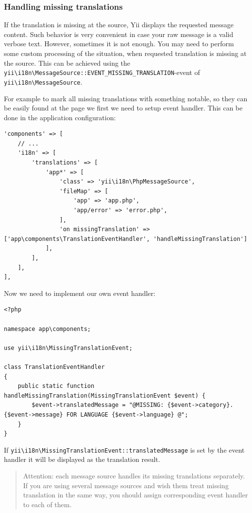 \subsubsection{Handling missing translations}
If the translation is missing at the source, Yii displays the requested message content. Such behavior is very convenient
in case your raw message is a valid verbose text. However, sometimes it is not enough.
You may need to perform some custom processing of the situation, when requested translation is missing at the source.
This can be achieved using the \texttt{yii{\allowbreak{}\textbackslash}i18n{\allowbreak{}\textbackslash}MessageSource\allowbreak{}::\allowbreak{}EVENT\_MISSING\_TRANSLATION}-event of \texttt{yii{\allowbreak{}\textbackslash}i18n{\allowbreak{}\textbackslash}MessageSource}.

For example to mark all missing translations with something notable, so they can be easily found at the page we
first we need to setup event handler. This can be done in the application configuration:

\lstset{language=php}\begin{lstlisting}
'components' => [
    // ...
    'i18n' => [
        'translations' => [
            'app*' => [
                'class' => 'yii\i18n\PhpMessageSource',
                'fileMap' => [
                    'app' => 'app.php',
                    'app/error' => 'error.php',
                ],
                'on missingTranslation' => ['app\components\TranslationEventHandler', 'handleMissingTranslation']
            ],
        ],
    ],
],
\end{lstlisting}
Now we need to implement our own event handler:

\lstset{language=php}\begin{lstlisting}
<?php

namespace app\components;

use yii\i18n\MissingTranslationEvent;

class TranslationEventHandler
{
    public static function handleMissingTranslation(MissingTranslationEvent $event) {
        $event->translatedMessage = "@MISSING: {$event->category}.{$event->message} FOR LANGUAGE {$event->language} @";
    }
}
\end{lstlisting}
If \texttt{yii{\allowbreak{}\textbackslash}i18n{\allowbreak{}\textbackslash}MissingTranslationEvent\allowbreak{}::\allowbreak{}translatedMessage} is set by the event handler it will be displayed as the translation result.

\begin{quote}Attention: each message source handles its missing translations separately. If you are using several message sources
and wish them treat missing translation in the same way, you should assign corresponding event handler to each of them.

\end{quote}
